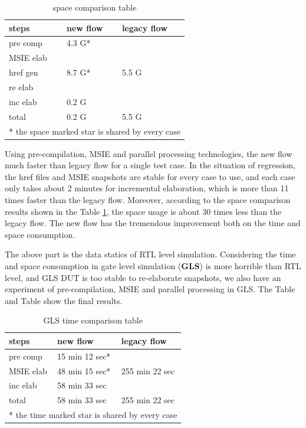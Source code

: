 \documentclass[twoside]{article}
\begin{document}
\begin{multicols}{2}
  \begin{table}[H]
    \caption{space comparison table}
    \centering
    \begin{tabular}{lll}
      \toprule
      \textbf{steps} & \textbf{new flow} & \textbf{legacy flow} \\
      \midrule
      pre comp & 4.3 G* & \multirow{5}{*}{5.5 G} \\
      \cline{1-2}
      MSIE elab & \multirow{3}{*}{8.7 G*} & \\
      \cline{1-1}
      href gen & & \\
      \cline{1-1}
      re elab & & \\
      \cline{1-2}
      inc elab & 0.2 G & \\
      \hline
      total & 0.2 G & 5.5 G \\
      \bottomrule
      \multicolumn{3}{l}{\footnotesize{* the space marked star is shared by every case}}
    \end{tabular}
    \label{table: space_result}
  \end{table}

  Using pre-compilation, MSIE and parallel processing technologies, the new flow much faster than legacy flow for a single test case. In the situation of regression, the href files and MSIE snapshots are stable for every case to use, and each case only takes about 2 minutes for incremental elaboration, which is more than 11 times faster than the legacy flow. Moreover, according to the space comparison results shown in the Table \ref{table: space_result}, the space usage is about 30 times less than the legacy flow. The new flow has the tremendous improvement both on the time and space consumption.

  The above part is the data statics of RTL level simulation. Considering the time and space consumption in gate level simulation (\textbf{GLS}) is more horrible than RTL level, and GLS DUT is too stable to re-elaborate snapshots, we also have an experiment of pre-compilation, MSIE and parallel processing in GLS. The Table and Table show the final results.

  \begin{table}[H]
    \caption{GLS time comparison table}
    \centering
    \begin{tabular}{lll}
      \toprule
      \textbf{steps} & \textbf{new flow} & \textbf{legacy flow} \\
      \midrule
      pre comp & 15 min 12 sec* & \multirow{3}{*}{255 min 22 sec} \\
      \cline{1-2}
      MSIE elab & 48 min 15 sec* & \\
      \cline{1-2}
      inc elab & 58 min 33 sec & \\
      \hline
      total & 58 min 33 sec & 255 min 22 sec \\
      \bottomrule
      \multicolumn{3}{l}{\footnotesize{* the time marked star is shared by every case}}
    \end{tabular}
    \label{table: gls_time_result}
  \end{table}


\end{multicols}
\end{document}
